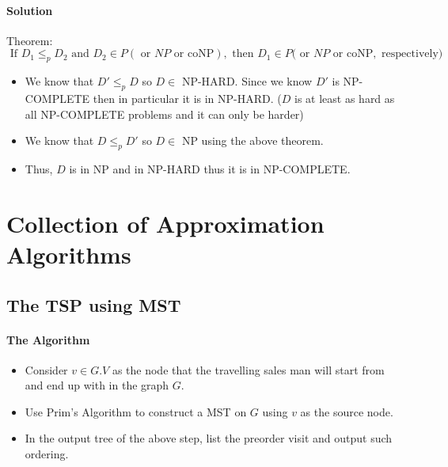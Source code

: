 \documentclass[10pt]{article}
\begin{document}
\paragraph{Solution} 

\color{Red}
Theorem: $$
    \text { If } D_{1} \leq_{p} D_{2} \text { and } D_{2} \in P(\text { or } N P \text { or } \mathrm{coNP}), \text { then } D_{1} \in P(\text { or } N P \text { or } \mathrm{coNP},\text { respectively) } $$ \color{Black}
\begin{itemize}
    \item We know that $D'\leq_p D$ so $D\in $ NP-HARD. Since we know $D'$ is NP-COMPLETE then in particular it is in NP-HARD. ($D$ is at least as hard as all NP-COMPLETE problems and it can only be harder)
    \item We know that $D\leq_p D'$ so $D\in$ NP using the above theorem.
    \item Thus, $D$ is in NP and in NP-HARD thus it is in NP-COMPLETE.
\end{itemize}


\section{Collection of Approximation Algorithms}
\subsection{The TSP using MST}

\paragraph{The Algorithm}
\begin{itemize}
    \item Consider $v\in G.V$ as the node that the travelling sales man will start from and end up with in the graph $G$.
    \item Use Prim's Algorithm to construct a MST on $G$ using $v$ as the source node.
    \item In the output tree of the above step, list the preorder visit and output such ordering.
\end{itemize}
\end{document}
